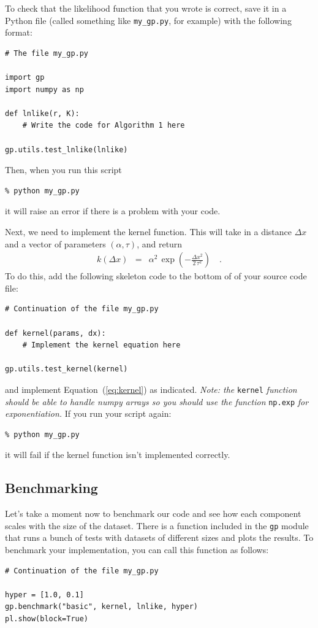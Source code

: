 \documentclass[12pt,preprint]{aastex}
\newcommand{\project}[1]{{\sffamily #1}}
\newcommand{\Eq}[1]{Equation~(\ref{eq:#1})}
\newcommand{\eq}[1]{\Eq{#1}}
\newcommand{\eqlabel}[1]{\label{eq:#1}}
\begin{document}
To check that the likelihood function that you wrote is correct, save it in a
Python file (called something like \texttt{my\_gp.py}, for example)
with the following format:
\begin{lstlisting}[frame=single]
# The file my_gp.py

import gp
import numpy as np

def lnlike(r, K):
    # Write the code for Algorithm 1 here

gp.utils.test_lnlike(lnlike)
\end{lstlisting}
Then, when you run this script
\begin{lstlisting}
% python my_gp.py
\end{lstlisting}
it will raise an error if there is a problem with your code.

Next, we need to implement the kernel function.
This will take in a distance $\Delta x$ and a vector of parameters
$(\alpha, \tau)$, and return
\begin{eqnarray}\eqlabel{kernel}
k(\Delta x) &=& \alpha^2\,\exp \left(-\frac{\Delta x^2}{2\,\tau^2}\right) \quad.
\end{eqnarray}
To do this, add the following skeleton code to the bottom of of your source
code file:
\begin{lstlisting}[frame=single]
# Continuation of the file my_gp.py

def kernel(params, dx):
    # Implement the kernel equation here

gp.utils.test_kernel(kernel)
\end{lstlisting}
and implement \eq{kernel} as indicated.
\emph{Note: the} \texttt{kernel} \emph{function should be able to handle
\project{numpy} arrays so you should use the function} \texttt{np.exp}
\emph{for exponentiation.}
If you run your script again:
\begin{lstlisting}
% python my_gp.py
\end{lstlisting}
it will fail if the kernel function isn't implemented correctly.

\subsection{Benchmarking}

Let's take a moment now to benchmark our code and see how each component
scales with the size of the dataset.
There is a function included in the \texttt{gp} module that runs a bunch of
tests with datasets of different sizes and plots the results.
To benchmark your implementation, you can call this function as follows:
\begin{lstlisting}[frame=single]
# Continuation of the file my_gp.py

hyper = [1.0, 0.1]
gp.benchmark("basic", kernel, lnlike, hyper)
pl.show(block=True)
\end{lstlisting}
\end{document}
